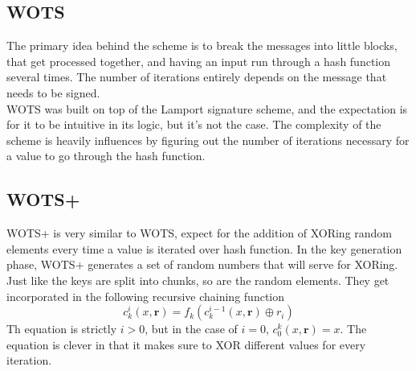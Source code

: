 \documentclass[]{scrartcl}
\begin{document}
\subsection*{WOTS}
The primary idea behind the scheme is to break the messages into little blocks, that get processed together, and having an input run through a hash function several times. The number of iterations entirely depends on the message that needs to be signed.\\
WOTS was built on top of the Lamport signature scheme, and the expectation is for it to be intuitive in its logic, but it's not the case. The complexity of the scheme is heavily influences by figuring out the number of iterations necessary for a value to go through the hash function.

\subsection*{WOTS+}
WOTS+ is very similar to WOTS, expect for the addition of XORing random elements every time a value is iterated over hash function. In the key generation phase, WOTS+ generates a set of random numbers that will serve for XORing. Just like the keys are split into chunks, so are the random elements. They get incorporated in the following recursive chaining function
\begin{equation}
c_{k}^{i}(x,\textbf{r}) = f_{k}(c_{k}^{i-1}(x,\textbf{r}) \oplus r_{i})
\end{equation}
Th equation is strictly $i > 0$, but in the case of $i = 0$, $c_{0}^{k}(x,\textbf{r}) = x$. The equation is clever in that it makes sure to XOR different values for every iteration. 
\end{document}
